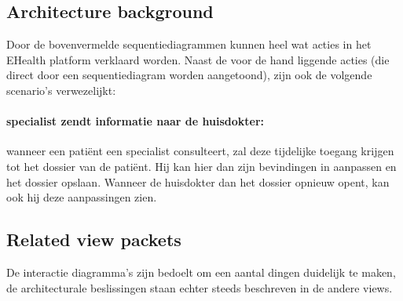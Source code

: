 \documentclass[a4paper,10pt]{article}
\begin{document}
\subsection{Architecture background}

Door de bovenvermelde sequentiediagrammen kunnen heel wat acties in het EHealth platform verklaard worden. 
Naast de voor de hand liggende acties (die direct door een sequentiediagram worden aangetoond), zijn ook de volgende scenario's verwezelijkt: 
\paragraph{specialist zendt informatie naar de huisdokter:}
wanneer een patiënt een specialist consulteert, zal deze tijdelijke toegang krijgen tot het dossier van de patiënt. Hij kan hier dan zijn bevindingen in aanpassen en het dossier opslaan. Wanneer de huisdokter dan het dossier opnieuw opent, kan ook hij deze aanpassingen zien. 

\subsection{Related view packets}
De interactie diagramma's zijn bedoelt om een aantal dingen duidelijk te maken, de architecturale beslissingen staan echter steeds beschreven in de andere views.
\end{document}
